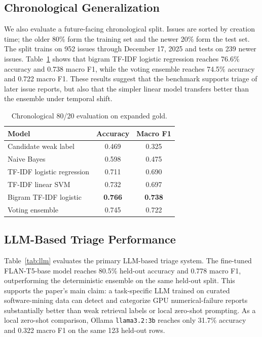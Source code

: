 \documentclass[conference]{IEEEtran}
\begin{document}
\subsection{Chronological Generalization}

We also evaluate a future-facing chronological split. Issues are sorted by
creation time; the older 80\% form the training set and the newer 20\% form the
test set. The split trains on 952 issues through December 17, 2025 and tests on
239 newer issues. Table~\ref{tab:time} shows that bigram TF-IDF logistic
regression reaches 76.6\% accuracy and 0.738 macro F1, while the voting
ensemble reaches 74.5\% accuracy and 0.722 macro F1. These results suggest
that the benchmark supports triage of later issue reports, but also that the
simpler linear model transfers better than the ensemble under temporal shift.

\begin{table}[t]
\centering
\caption{Chronological 80/20 evaluation on expanded gold.}
\label{tab:time}
\begin{tabular}{lcc}
\toprule
Model & Accuracy & Macro F1 \\
\midrule
Candidate weak label & 0.469 & 0.325 \\
Naive Bayes & 0.598 & 0.475 \\
TF-IDF logistic regression & 0.711 & 0.690 \\
TF-IDF linear SVM & 0.732 & 0.697 \\
Bigram TF-IDF logistic & \textbf{0.766} & \textbf{0.738} \\
Voting ensemble & 0.745 & 0.722 \\
\bottomrule
\end{tabular}
\end{table}

\subsection{LLM-Based Triage Performance}

Table~\ref{tab:llm} evaluates the primary LLM-based triage system. The
fine-tuned FLAN-T5-base model reaches 80.5\% held-out accuracy and 0.778 macro
F1, outperforming the deterministic ensemble on the same held-out split. This
supports the paper's main claim: a task-specific LLM trained on curated
software-mining data can detect and categorize GPU numerical-failure reports
substantially better than weak retrieval labels or local zero-shot prompting.
As a local zero-shot comparison, Ollama
\texttt{llama3.2:3b} reaches only 31.7\% accuracy and 0.322 macro F1 on the
same 123 held-out rows.
\end{document}
